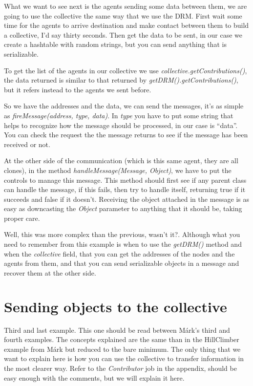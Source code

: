\documentclass{article}
\begin{document}
What we want to see next is the agents sending some data between them, we are going to use the collective the same way that we use the DRM. First wait some time for the agents to arrive destination and make contact between them to build a collective, I'd say thirty seconds. Then get the data to be sent, in our case we create a hashtable with random strings, but you can send anything that is serializable.

To get the list of the agents in our collective we use \textsl{collective.getContributions()}, the data returned is similar to that returned by \textsl{getDRM().getContributions()}, but it refers instead to the agents we sent before.

So we have the addresses and the data, we can send the messages, it's as simple as \textsl{fireMessage(address, type, data)}. In \textsl{type} you have to put some string that helps to recognize how the message should be processed, in our case is ``data''. You can check the request the the message returns to see if the message has been received or not.

At the other side of the communication (which is this same agent, they are all clones), in the method \textsl{handleMessage(Message, Object)}, we have to put the controls to manage this message. This method should first see if any parent class can handle the message, if this fails, then try to handle itself, returning true if it succeeds and false if it doesn't. Receiving the object attached in the message is as easy as downcasting the \textsl{ Object} parameter to anything that it should be, taking proper care.

Well, this was more complex than the previous, wasn't it?. Although what you need to remember from this example is when to use the \textsl{getDRM()} method and when the \textsl{collective} field, that you can get the addresses of the nodes and the agents from them, and that you can send serializable objects in a message and recover them at the other side.

\section{Sending objects to the collective}

Third and last example. This one should be read between M\'ark's third and fourth examples. The concepts explained are the same than in the HillClimber example from M\'ark but reduced to the bare minimum. The only thing that we want to explain here is how you can use the collective to transfer information in the most clearer way. Refer to the \textsl{Contributor} job in the appendix, should be easy enough with the comments, but we will explain it here.
\end{document}
